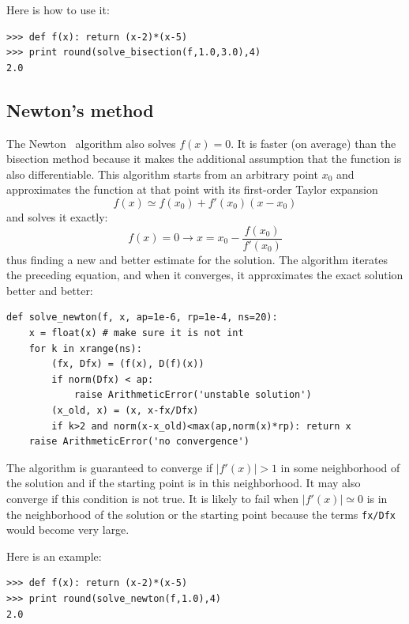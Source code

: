 \documentclass[justified,sixbynine]{tufte-book}
\def\ft{\small\tt}
\theoremstyle{plain}%
\theoremstyle{definition}
\theoremstyle{remark}
\begin{document}
\begin{fullwidth}
Here is how to use it:

\begin{lstlisting}[caption={in file: {\ft nlib.py}}]
>>> def f(x): return (x-2)*(x-5)
>>> print round(solve_bisection(f,1.0,3.0),4)
2.0
\end{lstlisting}

\goodbreak\subsection{Newton's method}


The Newton~\cite{newton} algorithm also solves $f(x)=0$. It is faster (on average) than the bisection method because it makes the additional assumption that the function is also differentiable. This algorithm starts from an arbitrary point $x_0$ and approximates the function at that point with its first-order Taylor expansion
\begin{equation}
f(x) \simeq f(x_0) + f'(x_0)(x-x_0)
\end{equation}
and solves it exactly:
\begin{equation}
f(x) = 0 \rightarrow x = x_0 - \frac{f(x_0)}{f'(x_0)}
\end{equation}
thus finding a new and better estimate for the solution. The algorithm iterates the preceding equation, and when it converges, it approximates the exact solution better and better:

\begin{lstlisting}[caption={in file: {\ft nlib.py}}]
def solve_newton(f, x, ap=1e-6, rp=1e-4, ns=20):
    x = float(x) # make sure it is not int
    for k in xrange(ns):
        (fx, Dfx) = (f(x), D(f)(x))
        if norm(Dfx) < ap:
            raise ArithmeticError('unstable solution')
        (x_old, x) = (x, x-fx/Dfx)
        if k>2 and norm(x-x_old)<max(ap,norm(x)*rp): return x
    raise ArithmeticError('no convergence')
\end{lstlisting}

The algorithm is guaranteed to converge if $|f'(x)|>1$ in some neighborhood of the solution and if the starting point is in this neighborhood. It may also converge if this condition is not true. It is likely to fail when $|f'(x)|\simeq 0$ is in the neighborhood of the solution or the starting point because the terms {\ft fx/Dfx} would become very large.

Here is an example:

\begin{lstlisting}[caption={in file: {\ft nlib.py}}]
>>> def f(x): return (x-2)*(x-5)
>>> print round(solve_newton(f,1.0),4)
2.0
\end{lstlisting}


\end{fullwidth}
\end{document}
